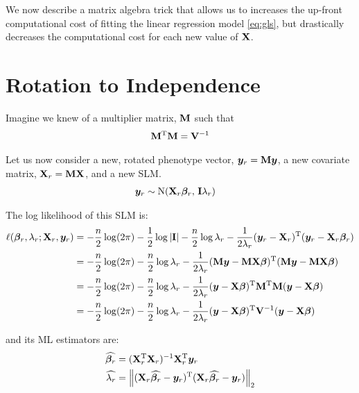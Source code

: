 We now describe a matrix algebra trick that allows us to increases the up-front computational cost of fitting the linear regression model \cref{eq:gls}, but drastically decreases the computational cost for each new value of $\mathbf{X}$.


\section{Rotation to Independence}

Imagine we knew of a multiplier matrix, $\mathbf{M}$ such that
\begin{align}
	\mathbf{M} ^\mathrm{T} \mathbf{M} = \mathbf{V} ^{-1}
\end{align}
 
Let us now consider a new, rotated phenotype vector, $\bm{y}_r = \mathbf{M} \bm{y}$, a new covariate matrix, $\mathbf{X}_r = \mathbf{M} \mathbf{X}$, and a new SLM.
\begin{align}
    \bm{y}_r &\sim \mathrm{N}(\mathbf{X}_r \boldsymbol{\beta}_r, \, \mathbf{I} \lambda_r)
\end{align}

The log likelihood of this SLM is:
\begin{align}
    \ell(\boldsymbol{\beta}_r, \lambda_r; \mathbf{X}_r, \bm{y}_r) 
    &=    -\frac{n}{2}\log(2\pi)
          -\frac{1}{2}\log|\mathbf{I}|
          -\frac{n}{2}\log\lambda_r
          -\frac{1}{2\lambda_r}
          (\bm{y}_r - \mathbf{X}_r)^\mathrm{T} (\bm{y}_r - \mathbf{X}_r\boldsymbol{\beta}_r)\\
    & =
          -\frac{n}{2}\log(2\pi)
          -\frac{n}{2}\log\lambda_r
          -\frac{1}{2\lambda_r}
          (\mathbf{M}\bm{y} - \mathbf{M}\mathbf{X}\boldsymbol{\beta})^\mathrm{T} (\mathbf{M}\bm{y} - \mathbf{M}\mathbf{X}\boldsymbol{\beta})\\
    &=    -\frac{n}{2}\log(2\pi)
          -\frac{n}{2}\log\lambda_r
          -\frac{1}{2\lambda_r}
          (\bm{y} - \mathbf{X}\boldsymbol{\beta})^\mathrm{T} \mathbf{M}^\mathrm{T} \mathbf{M} (\bm{y} - \mathbf{X}\boldsymbol{\beta})\\
    &=    -\frac{n}{2}\log(2\pi)
          -\frac{n}{2}\log\lambda_r
          -\frac{1}{2\lambda_r}
          (\bm{y}-\mathbf{X}\boldsymbol{\beta})^\mathrm{T} \mathbf{V}^{-1} (\bm{y}-\mathbf{X}\boldsymbol{\beta})
\end{align}

and its ML estimators are:
\begin{align}
    \widehat{\boldsymbol{\beta}_r}    &= (\mathbf{X}_r ^\mathrm{T} \mathbf{X}_r) ^{-1} \mathbf{X}_r ^\mathrm{T} \bm{y}_r\\
    \widehat{\lambda_r}   &= \left\lVert(\mathbf{X}_r \widehat{\boldsymbol{\beta}_r} - \bm{y}_r)^\mathrm{T}(\mathbf{X}_r \widehat{\boldsymbol{\beta}_r} - \bm{y}_r)\right\rVert_{2}
\end{align}



